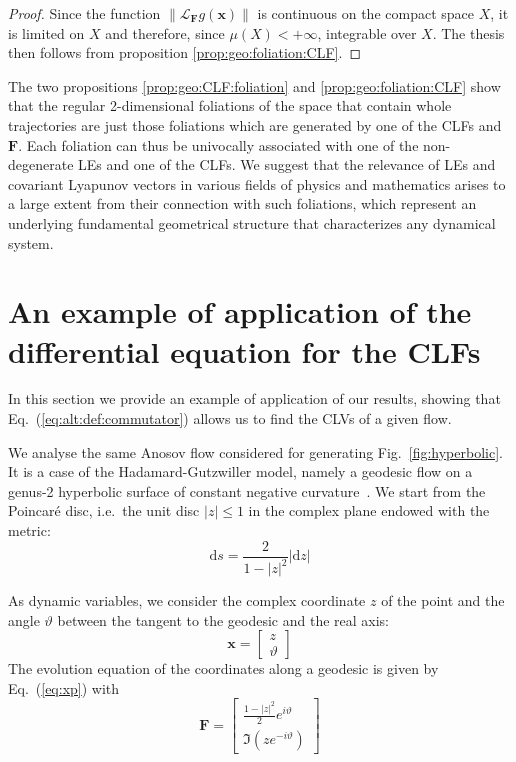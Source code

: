 \documentclass{article}
\theoremstyle{plain}
\theoremstyle{definition}
\theoremstyle{remark}
\newcommand{\vect}[1]{\boldsymbol{#1}}
\begin{document}
\begin{proof}
Since the function $\lVert \mathcal{L}_{\vect{F}} g(\vect{x}) \rVert$ is
continuous on the compact space $X$, it is limited on $X$ and
therefore, since $\mu(X)<+\infty$, integrable over $X$. The thesis
then follows from proposition \ref{prop:geo:foliation:CLF}.
\end{proof}


The two propositions \ref{prop:geo:CLF:foliation} and
\ref{prop:geo:foliation:CLF} show that the regular 
2-dimensional foliations of the
space that contain whole trajectories are just those foliations
which are
generated by one of the CLFs and $\vect{F}$. Each foliation can thus
be univocally associated with one of the non-degenerate LEs and one of
the CLFs. We suggest that the relevance
of LEs and covariant Lyapunov vectors in various fields of physics and
mathematics arises to a large extent from their connection with such
foliations, which represent an underlying fundamental geometrical
structure that characterizes any dynamical system.
 
\section{An example of application of the differential equation for the CLFs}
\label{sect:hyperbolic}

In this section we provide an example of application of our results,
showing that Eq.~(\ref{eq:alt:def:commutator}) allows us to find the CLVs
of a given flow.

We analyse the same Anosov flow considered for generating
Fig.~\ref{fig:hyperbolic}.  It is a case of the Hadamard-Gutzwiller model,
namely a geodesic flow on a
genus-2 hyperbolic surface of constant negative curvature~\cite{braun2002}. 
We start from the Poincar\'e disc, i.e.\ the unit disc $|z|\leq 1$ in
the complex plane endowed with the metric:
\begin{equation}\label{eq:pmetric}
  \mathrm{d}s = \frac{2}{1-\left|z\right|^2} |\mathrm{d}z|
\end{equation}

As dynamic variables, we consider the complex coordinate $z$ of the point
and the angle $\vartheta$ between the tangent to the geodesic and
the real axis:
\begin{equation}
  \vect{x} = \left[ \begin{array}{c} z \\ \vartheta \end{array} \right]
\end{equation}
The evolution equation of the coordinates along a geodesic 
is given by Eq.~(\ref{eq:xp}) with
\begin{equation}
  \vect{F} = \left[ \begin{array}{c}
  \frac{1-\left|z\right|^2}{2} e^{i \vartheta}
  \\
  \Im{\left(z e^{-i \vartheta}\right)}
  \end{array} \right]
\end{equation}
\end{document}
